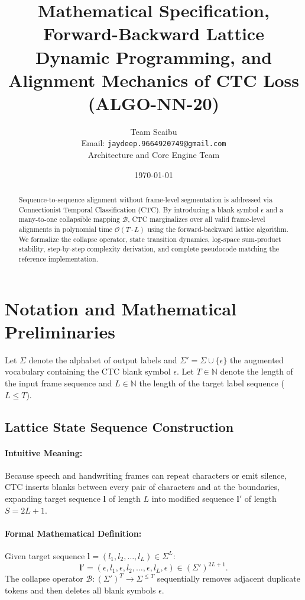 \documentclass[11pt]{article}
\title{\textbf{Mathematical Specification, Forward-Backward Lattice Dynamic Programming, and Alignment Mechanics of CTC Loss (ALGO-NN-20)}}
\author{Team Scaibu \\ \small Email: \texttt{jaydeep.9664920749@gmail.com} \\ \small Architecture and Core Engine Team}
\date{\today}
\begin{document}
\maketitle

\begin{abstract}
Sequence-to-sequence alignment without frame-level segmentation is addressed via Connectionist Temporal Classification (CTC). By introducing a blank symbol $\epsilon$ and a many-to-one collapsible mapping $\mathcal{B}$, CTC marginalizes over all valid frame-level alignments in polynomial time $\mathcal{O}(T \cdot L)$ using the forward-backward lattice algorithm. We formalize the collapse operator, state transition dynamics, log-space sum-product stability, step-by-step complexity derivation, and complete pseudocode matching the reference implementation.
\end{abstract}

\section{Notation and Mathematical Preliminaries}
\label{sec:notation}

Let $\Sigma$ denote the alphabet of output labels and $\Sigma' = \Sigma \cup \{\epsilon\}$ the augmented vocabulary containing the CTC blank symbol $\epsilon$. Let $T \in \mathbb{N}$ denote the length of the input frame sequence and $L \in \mathbb{N}$ the length of the target label sequence ($L \le T$).

\subsection{Lattice State Sequence Construction}
\paragraph{Intuitive Meaning:} Because speech and handwriting frames can repeat characters or emit silence, CTC inserts blanks between every pair of characters and at the boundaries, expanding target sequence $\mathbf{l}$ of length $L$ into modified sequence $\mathbf{l}'$ of length $S = 2L + 1$.

\paragraph{Formal Mathematical Definition:}
Given target sequence $\mathbf{l} = (l_1, l_2, \dots, l_L) \in \Sigma^L$:
\begin{equation}
\label{eq:l_prime_def}
\mathbf{l}' = (\epsilon, l_1, \epsilon, l_2, \dots, \epsilon, l_L, \epsilon) \in (\Sigma')^{2L+1}.
\end{equation}
The collapse operator $\mathcal{B}: (\Sigma')^T \to \Sigma^{\le T}$ sequentially removes adjacent duplicate tokens and then deletes all blank symbols $\epsilon$.
\end{document}
